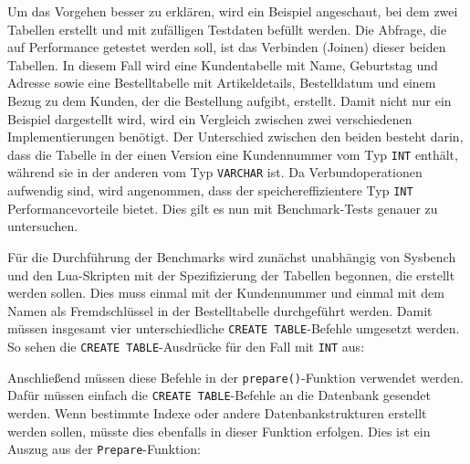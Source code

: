 Um das Vorgehen besser zu erklären, wird ein Beispiel angeschaut, bei dem zwei Tabellen erstellt und mit zufälligen Testdaten befüllt werden.
Die Abfrage, die auf Performance getestet werden soll, ist das Verbinden (Joinen) dieser beiden Tabellen.
In diesem Fall wird eine Kundentabelle mit Name, Geburtstag und Adresse sowie eine Bestelltabelle mit Artikeldetails, Bestelldatum und einem Bezug zu dem Kunden, der die Bestellung aufgibt, erstellt.
Damit nicht nur ein Beispiel dargestellt wird, wird ein Vergleich zwischen zwei verschiedenen Implementierungen benötigt.
Der Unterschied zwischen den beiden besteht darin, dass die Tabelle in der einen Version eine Kundennummer vom Typ \texttt{INT} enthält, während sie in der anderen vom Typ \texttt{VARCHAR} ist.
Da Verbundoperationen aufwendig sind, wird angenommen, dass der speichereffizientere Typ \texttt{INT} Performancevorteile bietet.
Dies gilt es nun mit Benchmark-Tests genauer zu untersuchen.

Für die Durchführung der Benchmarks wird zunächst unabhängig von Sysbench und den Lua-Skripten mit der Spezifizierung der Tabellen begonnen, die erstellt werden sollen.
Dies muss einmal mit der Kundennummer und einmal mit dem Namen als Fremdschlüssel in der Bestelltabelle durchgeführt werden.
Damit müssen insgesamt vier unterschiedliche \texttt{CREATE TABLE}-Befehle umgesetzt werden.
So sehen die \texttt{CREATE TABLE}-Ausdrücke für den Fall mit \texttt{INT} aus:

\vspace{-10pt}

\vspace{-5pt}


\vspace{-5pt}

Anschließend müssen diese Befehle in der \texttt{prepare()}-Funktion verwendet werden.
Dafür müssen einfach die \texttt{CREATE TABLE}-Befehle an die Datenbank gesendet werden.
Wenn bestimmte Indexe oder andere Datenbankstrukturen erstellt werden sollen, müsste dies ebenfalls in dieser Funktion erfolgen.
Dies ist ein Auszug aus der \texttt{Prepare}-Funktion:


